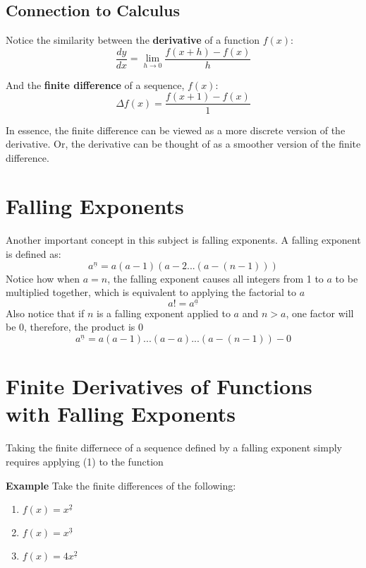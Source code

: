 \documentclass{article}
\begin{document}
\subsection{Connection to Calculus}
Notice the similarity between the \textbf{derivative} of a function \(f(x)\): 
\begin{equation} \label{eq:2}
    \frac{dy}{dx} = \lim_{h \to 0}\frac{f(x+h) - f(x)}{h}
\end{equation}

And the \textbf{finite difference} of a sequence, \(f(x)\): 
\[\Delta f(x) = \frac{f(x+1) - f(x)}{1}\]

In essence, the finite difference can be viewed as a more discrete version of the derivative. Or, the derivative can be thought of as a smoother version of the finite difference.


\section{Falling Exponents}
Another important concept in this subject is falling exponents. A falling exponent is defined as:
\begin{equation}\label{eq:3}
    a^{\underline{n}} = a(a-1)(a-2...(a-(n-1)))
\end{equation}
Notice how when \(a=n\), the falling exponent causes all integers from 1 to \(a\) to be multiplied together, which is equivalent to applying the factorial to \(a\)
\[a! = a^{\underline{a}}\]
Also notice that if \(n\) is a falling exponent applied to \(a\) and \(n>a\), one factor will be 0, therefore, the product is 0
\[a^{\underline{n}} = a(a-1)...(a-a)...(a-(n-1)) - 0\]

\section{Finite Derivatives of Functions with Falling Exponents}
Taking the finite differnece of a sequence defined by a falling exponent simply requires applying (1) to the function

\textbf{Example}
Take the finite differences of the following:
\begin{enumerate}
    \item \(f(x) = x^{\underline{2}}\)
    \item \(f(x) = x^{\underline{3}}\)
    \item \(f(x) = 4x^{\underline{2}}\)
\end{enumerate}
\end{document}
